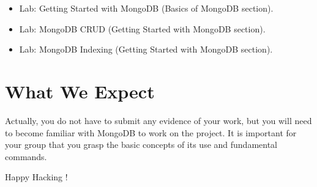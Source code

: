 \documentclass{article}
\begin{document}
\begin{itemize}
    \item Lab: Getting Started with MongoDB (Basics of MongoDB section).
    \item Lab: MongoDB CRUD (Getting Started with MongoDB section).
    \item Lab: MongoDB Indexing (Getting Started with MongoDB section).
\end{itemize}

\section{What We Expect}
Actually, you do not have to submit any evidence of your work, but you will need to become familiar with MongoDB to work on the project. It is important for your group that you grasp the basic concepts of its use and fundamental commands.

\vspace{5mm}
Happy Hacking !
\end{document}
